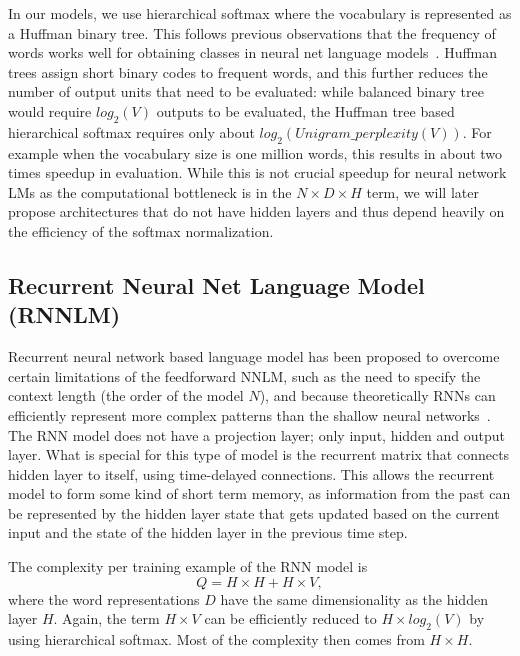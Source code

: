 \documentclass{article} %
\begin{document}
In our models, we use hierarchical softmax where the vocabulary is represented as a Huffman binary tree.
This follows previous observations that the frequency of words works well for obtaining classes in neural net language models~\cite{MikolovICASSP2011}.
Huffman trees assign short binary codes to frequent words, and this further reduces the number of output units that need to be evaluated: while balanced binary tree would require $log_{2}(V)$
outputs to be evaluated, the Huffman tree based hierarchical softmax requires only about $log_{2}(Unigram\_perplexity(V))$. For example when the vocabulary size is one million words, this results in about two times speedup in evaluation.
While this is not crucial speedup for neural network LMs as the computational bottleneck is in the $N \times D \times H$ term, we will later propose architectures that do not have hidden layers and thus depend
heavily on the efficiency of the softmax normalization.

\subsection{Recurrent Neural Net Language Model (RNNLM)}

Recurrent neural network based language model has been proposed to overcome certain limitations of the feedforward NNLM, such as the need to specify the context length (the order of the model $N$), and because
theoretically RNNs can efficiently represent more complex patterns than the shallow neural networks~\cite{MikolovIS, BengioAI}. The RNN model does not have a projection layer; only input, hidden and output layer.
What is special for this type of model is the recurrent matrix that connects hidden layer to itself, using time-delayed connections. This allows the recurrent model to form some kind of short term memory, as information
from the past can be represented by the hidden layer state that gets updated based on the current input and the state of the hidden layer in the previous time step.

The complexity per training example of the RNN model is
\begin{equation}
Q = H \times H + H \times V,
\end{equation}
where the word representations $D$ have the same dimensionality as the hidden layer $H$. Again, the term $H \times V$ can be efficiently reduced to $H \times log_{2}(V)$ by using hierarchical softmax. Most of the complexity
then comes from $H \times H$.

\end{document}
